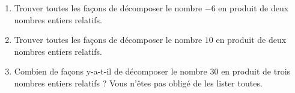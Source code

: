 
\begin{exercice}\label{exosmath-0750}

    \begin{enumerate}
        \item
Trouver toutes les façons de décomposer le nombre $-6$ en produit de deux nombres entiers relatifs.
\item
Trouver toutes les façons de décomposer le nombre \( 10\) en produit de deux nombres entiers relatifs.
\item
        Combien de façons y-a-t-il de décomposer le nombre $ 30 $ en produit de trois nombres entiers relatifs ? Vous n'êtes pas obligé de les lister toutes.
    \end{enumerate}

\end{exercice}
